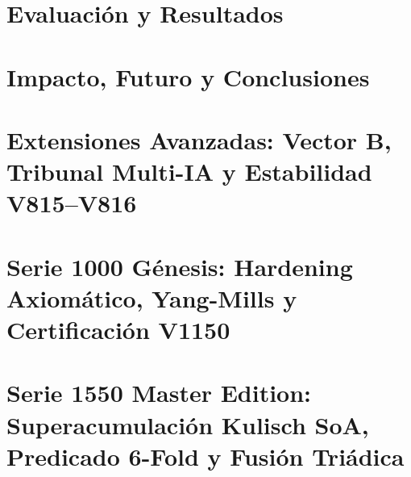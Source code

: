 \documentclass[12pt, a4paper, twoside]{report}
\theoremstyle{definition}
\theoremstyle{remark}
\begin{document}
\part{Evaluación y Resultados}






\part{Impacto, Futuro y Conclusiones}





\part{Extensiones Avanzadas: Vector B, Tribunal Multi-IA y Estabilidad V815--V816}





\part{Serie 1000 Génesis: Hardening Axiomático, Yang-Mills y Certificación V1150}





\part{Serie 1550 Master Edition: Superacumulación Kulisch SoA, Predicado 6-Fold y Fusión Triádica}
\end{document}
